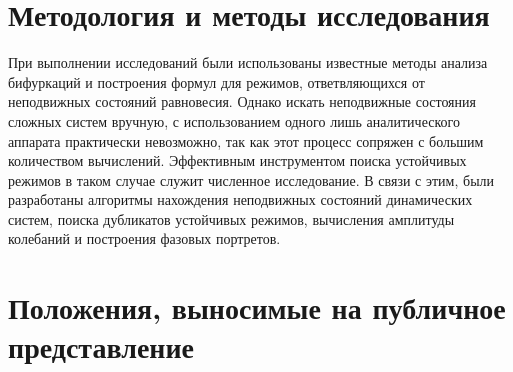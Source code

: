 \documentclass[12pt]{extarticle}
\begin{document}
\hspace{0cm}

\hspace{0cm}

\hspace{0cm}

\section*{Методология и методы исследования}

\hspace{0cm}

\hspace{0cm}

\hspace{0cm}

При выполнении исследований были использованы известные методы анализа бифуркаций и построения формул для режимов, ответвляющихся от неподвижных состояний равновесия. Однако искать неподвижные состояния сложных систем вручную, с использованием одного лишь аналитического аппарата практически невозможно, так как этот процесс сопряжен с большим количеством вычислений. Эффективным инструментом поиска устойчивых режимов в таком случае служит численное исследование. В связи с этим, были разработаны алгоритмы нахождения неподвижных состояний динамических систем, поиска дубликатов устойчивых режимов, вычисления амплитуды колебаний и построения фазовых портретов.

\newpage

\section*{Положения, выносимые на публичное представление}

\hspace{0cm}

\hspace{0cm}

\hspace{0cm}
\end{document}
